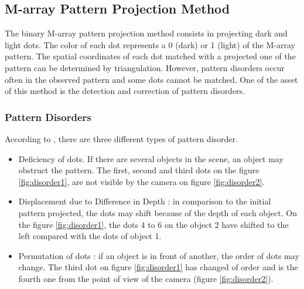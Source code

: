 \subsection{M-array Pattern Projection Method \cite{morita1988reconstruction}}

The binary M-array pattern projection method consists in projecting dark and light dots. The color of each dot represents a 0 (dark) or 1 (light) of the M-array pattern. The spatial coordinates of each dot matched with a projected one of the pattern can be determined by triangulation. However, pattern disorders occur often in the observed pattern and some dots cannot be matched. One of the asset of this method is the detection and correction of pattern disorders.

\subsubsection{Pattern Disorders}
\label{PatternDisorders}
According to \cite{morita1988reconstruction}, there are three different types of pattern disorder.
\begin{itemize}
\item Deficiency of dots. If there are several objects in the scene, an object may obstruct the pattern. The first, second and third dots on the figure \ref{fig:disorder1}, are not visible by the camera on figure \ref{fig:disorder2}.
\item Displacement due to Difference in Depth : in comparison to the initial pattern projected, the dots may shift because of the depth of each object. On the figure \ref{fig:disorder1}, the dots 4 to 6 on the object 2 have shifted to the left compared with the dots of object 1.
\item Permutation of dots : if an object is in front of another, the order of dots may change. The third dot on figure \ref{fig:disorder1} has changed of order and is the fourth one from the point of view of the camera (figure \ref{fig:disorder2}).
\end{itemize}

